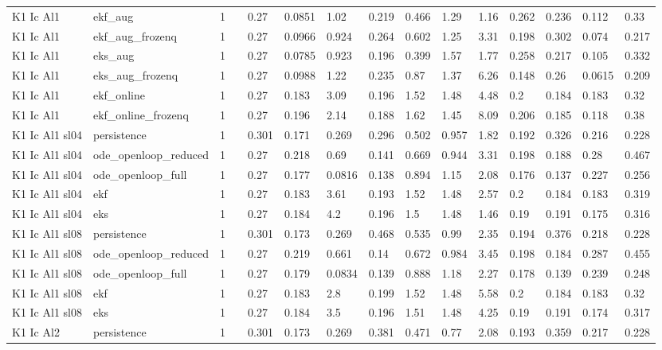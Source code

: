 \begin{table}[t]
\begin{tabular}{lllllllllllllll}
K1 Ic Al1 & ekf\_aug & 1 &  & 0.27 & 0.0851 & 1.02 & 0.219 & 0.466 & 1.29 & 1.16 & 0.262 & 0.236 & 0.112 & 0.33 \\
K1 Ic Al1 & ekf\_aug\_frozenq & 1 &  & 0.27 & 0.0966 & 0.924 & 0.264 & 0.602 & 1.25 & 3.31 & 0.198 & 0.302 & 0.074 & 0.217 \\
K1 Ic Al1 & eks\_aug & 1 &  & 0.27 & 0.0785 & 0.923 & 0.196 & 0.399 & 1.57 & 1.77 & 0.258 & 0.217 & 0.105 & 0.332 \\
K1 Ic Al1 & eks\_aug\_frozenq & 1 &  & 0.27 & 0.0988 & 1.22 & 0.235 & 0.87 & 1.37 & 6.26 & 0.148 & 0.26 & 0.0615 & 0.209 \\
K1 Ic Al1 & ekf\_online & 1 &  & 0.27 & 0.183 & 3.09 & 0.196 & 1.52 & 1.48 & 4.48 & 0.2 & 0.184 & 0.183 & 0.32 \\
K1 Ic Al1 & ekf\_online\_frozenq & 1 &  & 0.27 & 0.196 & 2.14 & 0.188 & 1.62 & 1.45 & 8.09 & 0.206 & 0.185 & 0.118 & 0.38 \\
K1 Ic Al1 sl04 & persistence & 1 &  & 0.301 & 0.171 & 0.269 & 0.296 & 0.502 & 0.957 & 1.82 & 0.192 & 0.326 & 0.216 & 0.228 \\
K1 Ic Al1 sl04 & ode\_openloop\_reduced & 1 &  & 0.27 & 0.218 & 0.69 & 0.141 & 0.669 & 0.944 & 3.31 & 0.198 & 0.188 & 0.28 & 0.467 \\
K1 Ic Al1 sl04 & ode\_openloop\_full & 1 &  & 0.27 & 0.177 & 0.0816 & 0.138 & 0.894 & 1.15 & 2.08 & 0.176 & 0.137 & 0.227 & 0.256 \\
K1 Ic Al1 sl04 & ekf & 1 &  & 0.27 & 0.183 & 3.61 & 0.193 & 1.52 & 1.48 & 2.57 & 0.2 & 0.184 & 0.183 & 0.319 \\
K1 Ic Al1 sl04 & eks & 1 &  & 0.27 & 0.184 & 4.2 & 0.196 & 1.5 & 1.48 & 1.46 & 0.19 & 0.191 & 0.175 & 0.316 \\
K1 Ic Al1 sl08 & persistence & 1 &  & 0.301 & 0.173 & 0.269 & 0.468 & 0.535 & 0.99 & 2.35 & 0.194 & 0.376 & 0.218 & 0.228 \\
K1 Ic Al1 sl08 & ode\_openloop\_reduced & 1 &  & 0.27 & 0.219 & 0.661 & 0.14 & 0.672 & 0.984 & 3.45 & 0.198 & 0.184 & 0.287 & 0.455 \\
K1 Ic Al1 sl08 & ode\_openloop\_full & 1 &  & 0.27 & 0.179 & 0.0834 & 0.139 & 0.888 & 1.18 & 2.27 & 0.178 & 0.139 & 0.239 & 0.248 \\
K1 Ic Al1 sl08 & ekf & 1 &  & 0.27 & 0.183 & 2.8 & 0.199 & 1.52 & 1.48 & 5.58 & 0.2 & 0.184 & 0.183 & 0.32 \\
K1 Ic Al1 sl08 & eks & 1 &  & 0.27 & 0.184 & 3.5 & 0.196 & 1.51 & 1.48 & 4.25 & 0.19 & 0.191 & 0.174 & 0.317 \\
K1 Ic Al2 & persistence & 1 &  & 0.301 & 0.173 & 0.269 & 0.381 & 0.471 & 0.77 & 2.08 & 0.193 & 0.359 & 0.217 & 0.228 \\

\end{tabular}
\end{table}
